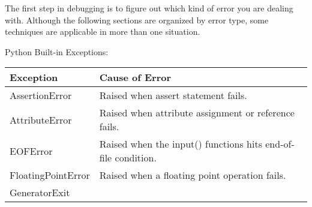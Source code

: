 \documentclass[11pt]{article}
\begin{document}
The first step in debugging is to figure out which kind of error you are
dealing with. Although the following sections are organized by error
type, some techniques are applicable in more than one situation.

    Python Built-in Exceptions:

\begin{longtable}[]{@{}ll@{}}
\toprule
\begin{minipage}[b]{0.15\columnwidth}\raggedright\strut
Exception\strut
\end{minipage} & \begin{minipage}[b]{0.79\columnwidth}\raggedright\strut
Cause of Error\strut
\end{minipage}\tabularnewline
\midrule
\endhead
\begin{minipage}[t]{0.15\columnwidth}\raggedright\strut
AssertionError\strut
\end{minipage} & \begin{minipage}[t]{0.79\columnwidth}\raggedright\strut
Raised when assert statement fails.\strut
\end{minipage}\tabularnewline
\begin{minipage}[t]{0.15\columnwidth}\raggedright\strut
AttributeError\strut
\end{minipage} & \begin{minipage}[t]{0.79\columnwidth}\raggedright\strut
Raised when attribute assignment or reference fails.\strut
\end{minipage}\tabularnewline
\begin{minipage}[t]{0.15\columnwidth}\raggedright\strut
EOFError\strut
\end{minipage} & \begin{minipage}[t]{0.79\columnwidth}\raggedright\strut
Raised when the input() functions hits end-of-file condition.\strut
\end{minipage}\tabularnewline
\begin{minipage}[t]{0.15\columnwidth}\raggedright\strut
FloatingPointError\strut
\end{minipage} & \begin{minipage}[t]{0.79\columnwidth}\raggedright\strut
Raised when a floating point operation fails.\strut
\end{minipage}\tabularnewline
\begin{minipage}[t]{0.15\columnwidth}\raggedright\strut
GeneratorExit\strut
\end{minipage} & \begin{minipage}[t]{0.79\columnwidth}\raggedright\strut

\end{minipage}
\end{longtable}
\end{document}
